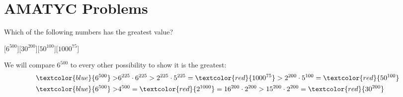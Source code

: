

\fancyhf{}

\parindent 0pt
\marginparsep 3pt


\setlength{\baselineskip}{5\baselineskip}
\setlength{\parskip}{5pt}


\newcommand{\simpleVertex}[3]{
    \Vertex[x=#1,y=#2,size=0.4,position=180,fontscale=1.6,style={color=gray}]{#3}
}
\newcommand{\invisibleVertex}[3]{
    \Vertex[x=#1,y=#2,size=0.5,opacity =0,position=180,fontscale=2,style={color=white}]{#3}
}

\newcommand{\AWAY}{A\mkern0mu W\mkern-4mu A\mkern0mu Y}
\newcommand{\AMA}{A\mkern0mu M\mkern-2mu A}
\newcommand{\TYC}{T\mkern1mu Y\mkern-2mu C}





\sloppy
\thispagestyle{fancy}

\section*{AMATYC Problems}

\begin{problem}
    Which of the following numbers has the greatest value?
\end{problem}

[$6^{500}$][$30^{200}$][$50^{100}$][$1000^{75}$]

\begin{solution}[B]
    We will compare $\boxed{6^{500}}$ to every other possibility to show it is the greatest:
    \begin{align*}
        \textcolor{blue}{6^{500}} >& 6^{225}\cdot6^{225}>2^{225}\cdot5^{225} = \textcolor{red}{1000^{75}} > 2^{200}\cdot5^{100}=\textcolor{red}{50^{100}} \\
        \textcolor{blue}{6^{500}} >& 4^{500} = \textcolor{red}{2^{1000}} = 16^{200} \cdot 2^{200} >
        15^{200} \cdot 2^{200} = \textcolor{red}{30^{200}} 
    \end{align*}
\end{solution}


